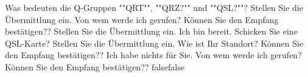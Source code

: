     {Was bedeuten die Q-Gruppen ""QRT"", ""QRZ?"" und ""QSL?""?}
    {Stellen Sie die Übermittlung ein. Von wem werde ich gerufen? Können Sie den Empfang bestätigen??}
    {Stellen Sie die Übermittlung ein. Ich bin bereit. Schicken Sie eine QSL-Karte?}
    {Stellen Sie die Übermittlung ein. Wie ist Ihr Standort? Können Sie den Empfang bestätigen??}
    {Ich habe nichts für Sie. Von wem werde ich gerufen? Können Sie den Empfang bestätigen??}
    {false}{false}